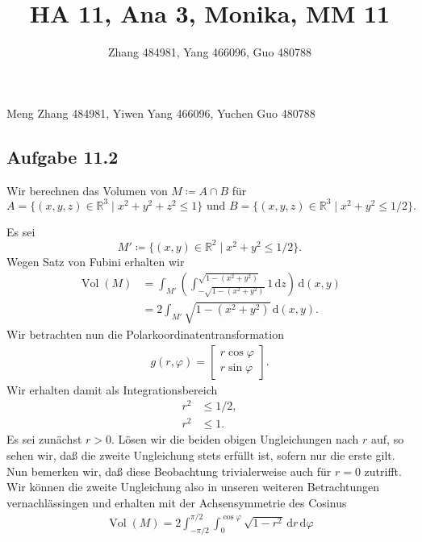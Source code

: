 \documentclass[draft,a5paper]{article}
\title{HA 11, Ana 3, Monika, MM 11}
\author{Zhang 484981, Yang 466096, Guo 480788}
\theoremstyle{remark}
\DeclareMathOperator{\Vol}{Vol}
\newcommand{\dd}{\,\mathrm{d}}
\begin{document}
\maketitle
\begin{center}
  Meng Zhang 484981, Yiwen Yang 466096, Yuchen Guo 480788
\end{center}
\subsection{Aufgabe 11.2}
Wir berechnen das Volumen von \(M \coloneq A \cap B\) für
\[
  A = \{(x, y, z) \in \mathbb{R}^{3} \mid x^{2} + y^{2} + z^{2} \le 1\} \text{ und }
  B = \{(x, y, z) \in \mathbb{R}^{3} \mid x^{2} + y^{2} \le 1/2\}.
\]

Es sei
\[
  M' \coloneq \{(x, y) \in \mathbb{R}^{2} \mid x^{2} + y^{2} \le 1/2 \}.
\]
Wegen Satz von Fubini erhalten wir
\begin{align*}
  \Vol(M) &= \int_{M'}\left(\int_{-\sqrt{1 - (x^{2} + y^{2})}}^{\sqrt{1 -
            (x^{2} + y^{2})}} 1 \dd z\right)\dd (x, y) \\
          &= 2\int_{M'}\sqrt{1 - (x^{2} + y^{2})} \dd (x, y).
\end{align*}
Wir betrachten nun die Polarkoordinatentransformation
\begin{align*}
  g(r, \varphi) =
  \begin{bmatrix}
    r \cos \varphi \\ r \sin \varphi
  \end{bmatrix}.
\end{align*}
Wir erhalten damit als Integrationsbereich
\begin{align*}
  r^{2} &\le 1/2, \\
  r^{2} &\le 1.
\end{align*}
Es sei zunächst \(r > 0\).  Lösen wir die beiden obigen Ungleichungen
nach \(r\) auf, so sehen wir, daß die zweite Ungleichung stets erfüllt
ist, sofern nur die erste gilt.  Nun bemerken wir, daß diese
Beobachtung trivialerweise auch für \(r = 0\) zutrifft.  Wir können die
zweite Ungleichung also in unseren weiteren Betrachtungen
vernachlässingen und erhalten mit der Achsensymmetrie des Cosinus
\begin{align*}
  \Vol(M) = 2 \int_{-\pi/2}^{\pi/2}{\int_{0}^{\cos \varphi}\sqrt{1-r^{2}}}\dd r \dd \varphi
\end{align*}
\end{document}
